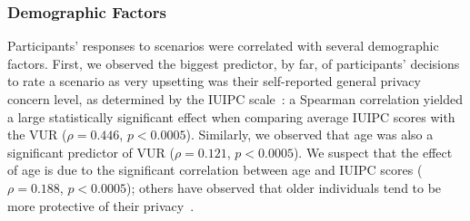 \documentclass{acm_proc_article-sp}
\begin{document}


\subsubsection{Demographic Factors}

Participants' responses to scenarios were correlated with several demographic factors. First, we observed the biggest predictor, by far, of participants' decisions to rate a scenario as very upsetting was their self-reported general privacy concern level, as determined by the IUIPC scale~\cite{malhotra2004internet}: a Spearman correlation yielded a large statistically significant effect when comparing average IUIPC scores with the VUR ($\rho=0.446$, $p<0.0005$). Similarly, we observed that age was also a significant predictor of VUR ($\rho=0.121$, $p<0.0005$). We suspect that the effect of age is due to the significant correlation between age and IUIPC scores ($\rho=0.188$, $p<0.0005$); others have observed that older individuals tend to be more protective of their privacy~\cite{varian2005demographics}.
\end{document}
